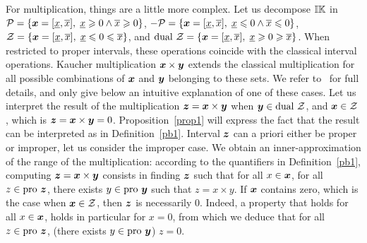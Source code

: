 \documentclass{sig-alternate-05-2015} %
\newcommand{\pro}{\mbox{pro }}
\def\K{{\Bbb I \Bbb K}}
\begin{document}
For multiplication, things are a little more complex. Let us decompose $\K$ in ${\cal P} = \{\x=[\underline x,\overline x], \; \underline x \geqslant 0 \wedge
\overline x \geqslant 0\}$, ${- \cal P} = \{\x=[\underline x,\overline x], \; \underline x \leqslant 0 \wedge
\overline x \leqslant 0\}$, 
${\cal Z} = \{\x=[\underline x,\overline x], \; \underline x \leqslant 0 \leqslant \overline x\}$, and 
${\mbox{dual } \cal Z} = \{\x=[\underline x,\overline x], \; \underline x \geqslant 0 \geqslant \overline x\}$. 
When restricted to proper intervals, these operations coincide with the 
classical interval operations.
Kaucher multiplication $\x \times \y$ extends the classical multiplication for all possible combinations of $\x$ and $\y$
belonging to these sets. We refer to~\cite{Kaucher} for full details, and only give below an intuitive explanation of one of these cases.
Let us  interpret the result of the multiplication $\z = \x \times \y$ when $\y \in \mbox{dual } \cal Z$, 
and $\x \in {\cal Z}$, which is $\z = \x \times \y = 0$. Proposition~\ref{prop1} will express the fact that 
the result can be interpreted as in Definition~\ref{pb1}. Interval $\z$ can a priori either be proper or improper, 
let us consider the improper case. We obtain an inner-approximation of the range of the multiplication: 
according to the quantifiers in Definition~\ref{pb1}, 
computing $\z = \x \times \y$ consists in finding $\z$ such that 
for all $x \in \x$, for all $z \in \pro \z$, there exists $y \in \pro \y$ such that $z=x \times y$. If $\x$ contains zero, 
which is the case when $\x \in {\cal Z}$, then $\z$ is necessarily $0$. 
Indeed, a property that holds for all $x \in \x$, holds in particular for $x=0$, from which we deduce that 
for all $z \in \pro \z$, (there exists $y \in \pro \y$) $z=0$.
\end{document}

